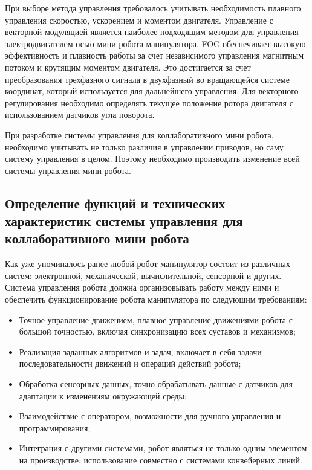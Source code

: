 При выборе метода управления требовалось учитывать необходимость плавного управления скоростью, ускорением и моментом двигателя. 
Управление с векторной модуляцией является наиболее подходящим методом для управления электродвигателем осью мини робота манипулятора. FOC обеспечивает высокую эффективность и плавность работы за счет независимого управления магнитным потоком и крутящим моментом двигателя. Это достигается за счет преобразования трехфазного сигнала в двухфазный во вращающейся системе 	координат, который используется для дальнейшего управления. Для векторного регулирования необходимо определять текущее положение ротора двигателя с использованием датчиков угла поворота.

При разработке системы управления для коллаборативного мини робота, необходимо учитывать не только различия  в управлении приводов, но саму систему управления в целом. Поэтому необходимо производить изменение всей системы управления мини робота. 


\subsection{Определение функций и технических характеристик системы управления для коллаборативного мини робота}

Как уже упоминалось ранее любой робот манипулятор состоит из различных систем: электронной, механической, вычислительной, сенсорной и других. Система управления робота должна организовывать работу между ними и обеспечить функционирование робота манипулятора по следующим требованиям:
\begin{itemize}
	\item Точное управление движением, плавное управление движениями робота с
	      большой точностью, включая синхронизацию всех суставов и механизмов;

	\item Реализация заданных алгоритмов и задач, включает в себя задачи
	      последовательности движений и операций действий робота;

	\item Обработка сенсорных данных, точно обрабатывать данные с датчиков для
	      адаптации к изменениям окружающей среды;

	\item Взаимодействие с оператором, возможности для ручного управления и
	      программирования;

	\item Интеграция с другими системами, робот являться не только одним
	      элементом на производстве, использование совместно с системами конвейерных
	      линий.
\end{itemize}



